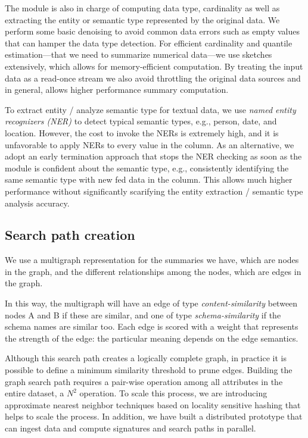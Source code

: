 The module is also in charge of computing data type, cardinality as well as
extracting the entity or semantic type represented by the original data. We
perform some basic denoising to avoid common data errors such as empty values
that can hamper the data type detection. For efficient cardinality and quantile
estimation---that we need to summarize numerical data---we use sketches
extensively, which allows for memory-efficient computation. By treating the
input data as a read-once stream we also avoid throttling the original data
sources and in general, allows higher performance summary computation.


To extract entity / analyze semantic type for textual data, we use {\em named entity recognizers (NER)} \cite{XXX} to detect typical semantic types, e.g., person, date, and location. However, the cost to invoke the NERs is extremely high, and it is unfavorable to apply NERs to every value in the column. As an alternative, we adopt an early termination approach that stops the NER checking as soon as the module is confident about the semantic type, e.g., consistently identifying the same semantic type with new fed data in the column. This allows much higher performance without significantly scarifying the entity extraction / semantic type analysis accuracy.



\subsection{Search path creation}
We use a multigraph representation for the summaries we have, which are nodes in the graph, and the different relationships among the nodes, which are edges in the graph. 

In this way, the multigraph will have an edge of type
\emph{content-similarity} between nodes A and B if these are similar, and one of
type \emph{schema-similarity} if the schema names are similar too. Each edge is
scored with a weight that represents the strength of the edge: the particular
meaning depends on the edge semantics.

Although this search path creates a logically complete graph, in practice it is
possible to define a minimum similarity threshold to prune edges. Building the
graph search path requires a pair-wise operation among all attributes in the
entire dataset, a $N^2$ operation. To scale this process, we are introducing
approximate nearest neighbor techniques based on locality sensitive hashing \cite{DBLP:conf/compgeom/DatarIIM04}
that helps to scale the process. In addition, we have built a distributed
prototype that can ingest data and compute signatures and search paths in
parallel.



